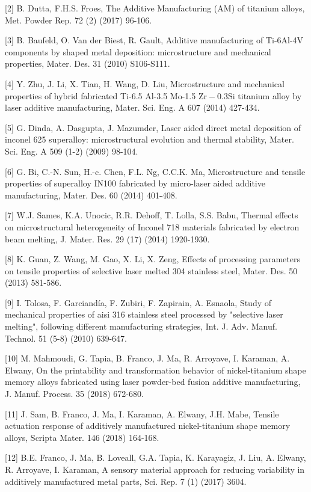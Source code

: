 \documentclass[10pt]{article}
\begin{document}
[2] B. Dutta, F.H.S. Froes, The Additive Manufacturing (AM) of titanium alloys, Met. Powder Rep. 72 (2) (2017) 96-106.

[3] B. Baufeld, O. Van der Biest, R. Gault, Additive manufacturing of Ti-6Al-4V components by shaped metal deposition: microstructure and mechanical properties, Mater. Des. 31 (2010) S106-S111.

[4] Y. Zhu, J. Li, X. Tian, H. Wang, D. Liu, Microstructure and mechanical properties of hybrid fabricated Ti-6.5 Al-3.5 Mo-1.5 $\mathrm{Zr}-0.3 \mathrm{Si}$ titanium alloy by laser additive manufacturing, Mater. Sci. Eng. A 607 (2014) 427-434.

[5] G. Dinda, A. Dasgupta, J. Mazumder, Laser aided direct metal deposition of inconel 625 superalloy: microstructural evolution and thermal stability, Mater. Sci. Eng. A 509 (1-2) (2009) 98-104.

[6] G. Bi, C.-N. Sun, H.-c. Chen, F.L. Ng, C.C.K. Ma, Microstructure and tensile properties of superalloy IN100 fabricated by micro-laser aided additive manufacturing, Mater. Des. 60 (2014) 401-408.

[7] W.J. Sames, K.A. Unocic, R.R. Dehoff, T. Lolla, S.S. Babu, Thermal effects on microstructural heterogeneity of Inconel 718 materials fabricated by electron beam melting, J. Mater. Res. 29 (17) (2014) 1920-1930.

[8] K. Guan, Z. Wang, M. Gao, X. Li, X. Zeng, Effects of processing parameters on tensile properties of selective laser melted 304 stainless steel, Mater. Des. 50 (2013) 581-586.

[9] I. Tolosa, F. Garciandía, F. Zubiri, F. Zapirain, A. Esnaola, Study of mechanical properties of aisi 316 stainless steel processed by "selective laser melting", following different manufacturing strategies, Int. J. Adv. Manuf. Technol. 51 (5-8) (2010) 639-647.

[10] M. Mahmoudi, G. Tapia, B. Franco, J. Ma, R. Arroyave, I. Karaman, A. Elwany, On the printability and transformation behavior of nickel-titanium shape memory alloys fabricated using laser powder-bed fusion additive manufacturing, J. Manuf. Process. 35 (2018) 672-680.

[11] J. Sam, B. Franco, J. Ma, I. Karaman, A. Elwany, J.H. Mabe, Tensile actuation response of additively manufactured nickel-titanium shape memory alloys, Scripta Mater. 146 (2018) 164-168.

[12] B.E. Franco, J. Ma, B. Loveall, G.A. Tapia, K. Karayagiz, J. Liu, A. Elwany, R. Arroyave, I. Karaman, A sensory material approach for reducing variability in additively manufactured metal parts, Sci. Rep. 7 (1) (2017) 3604.
\end{document}
